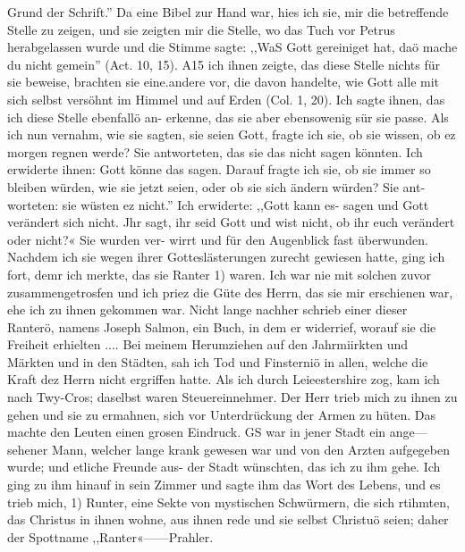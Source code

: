 Grund der Schrift.'' Da eine Bibel zur Hand war, hies ich sie,
mir die betreffende Stelle zu zeigen, und sie zeigten mir die Stelle,
wo das Tuch vor Petrus herabgelassen wurde und die Stimme
sagte: ,,WaS Gott gereiniget hat, daö mache du nicht gemein''
(Act. 10, 15). A15 ich ihnen zeigte, das diese Stelle nichts für
sie beweise, brachten sie eine.andere vor, die davon handelte, wie
Gott alle mit sich selbst versöhnt im Himmel und auf Erden
(Col. 1, 20). Ich sagte ihnen, das ich diese Stelle ebenfallö an-
erkenne, das sie aber ebensowenig sür sie passe. Als ich nun
vernahm, wie sie sagten, sie seien Gott, fragte ich sie, ob sie
wissen, ob ez morgen regnen werde? Sie antworteten, das sie
das nicht sagen könnten. Ich erwiderte ihnen: Gott könne das
sagen. Darauf fragte ich sie, ob sie immer so bleiben würden,
wie sie jetzt seien, oder ob sie sich ändern würden? Sie ant-
worteten: sie wüsten ez nicht.'' Ich erwiderte: ,,Gott kann es-
sagen und Gott verändert sich nicht. Jhr sagt, ihr seid Gott und
wist nicht, ob ihr euch verändert oder nicht?« Sie wurden ver-
wirrt und für den Augenblick fast überwunden. Nachdem ich sie
wegen ihrer Gotteslästerungen zurecht gewiesen hatte, ging ich
fort, demr ich merkte, das sie Ranter 1) waren. Ich war nie
mit solchen zuvor zusammengetrosfen und ich priez die Güte des
Herrn, das sie mir erschienen war, ehe ich zu ihnen gekommen
war. Nicht lange nachher schrieb einer dieser Ranterö, namens
Joseph Salmon, ein Buch, in dem er widerrief, worauf sie die
Freiheit erhielten ....
Bei meinem Herumziehen auf den Jahrmiirkten und Märkten
und in den Städten, sah ich Tod und Finsterniö in allen, welche
die Kraft dez Herrn nicht ergriffen hatte. Als ich durch Leieestershire
zog, kam ich nach Twy-Cros; daselbst waren Steuereinnehmer.
Der Herr trieb mich zu ihnen zu gehen und sie zu ermahnen,
sich vor Unterdrückung der Armen zu hüten. Das machte den
Leuten einen grosen Eindruck. GS war in jener Stadt ein ange—
sehener Mann, welcher lange krank gewesen war und von den
Arzten aufgegeben wurde; und etliche Freunde aus- der Stadt
wünschten, das ich zu ihm gehe. Ich ging zu ihm hinauf in sein
Zimmer und sagte ihm das Wort des Lebens, und es trieb mich,
1) Runter, eine Sekte von mystischen Schwürmern, die sich rtihmten,
das Christus in ihnen wohne, aus ihnen rede und sie selbst Christuö seien;
daher der Spottname ,,Ranter«——Prahler.


